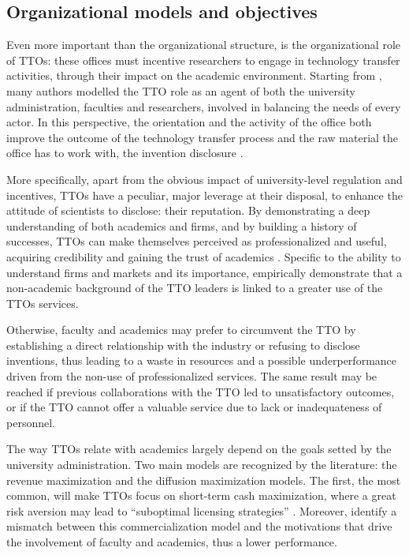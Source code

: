 \subsection{Organizational models and objectives}

Even more important than the organizational structure, is the organizational role of TTOs: these offices must incentive researchers to engage in technology transfer activities, through their impact on the academic environment. Starting from \citet{Jensen1998}, many authors modelled the TTO role as an agent of both the university administration, faculties and researchers, involved in balancing the needs of every actor. In this perspective, the orientation and the activity of the office both improve the outcome of the technology transfer process and the raw material the office has to work with, the invention disclosure \citep{Siegel2007}. 

More specifically, apart from the obvious impact of university-level regulation and incentives, TTOs have a peculiar, major leverage at their disposal, to enhance the attitude of scientists to disclose: their reputation. By demonstrating a deep understanding of both academics and firms, and by building a history of successes, TTOs can make themselves perceived as professionalized and useful, acquiring credibility and gaining the trust of academics \citep{OwenSmith2001}. Specific to the ability to understand firms and markets and its importance, \citet{Muscio2010} empirically demonstrate that a non-academic background of the TTO leaders is linked to a greater use of the TTOs services.

Otherwise, faculty and academics may prefer to circumvent the TTO by establishing a direct relationship with the industry or refusing to disclose inventions, thus leading to a waste in resources and a possible underperformance driven from the non-use of professionalized services. The same result may be reached if previous collaborations with the TTO  led to unsatisfactory outcomes, or if the TTO cannot offer a valuable service due to lack or inadequateness of personnel. 

The way TTOs relate with academics largely depend on the goals setted by the university administration. Two main models are recognized by the literature: the revenue maximization and the diffusion maximization models. The first, the most common, will make TTOs focus on short-term cash maximization, where a great risk aversion may lead to \enquote{suboptimal licensing strategies} \citep{Markman2005}. Moreover, \citet{Siegel2003} identify a mismatch between this commercialization model and the motivations that drive the involvement of faculty and academics, thus a lower performance.


